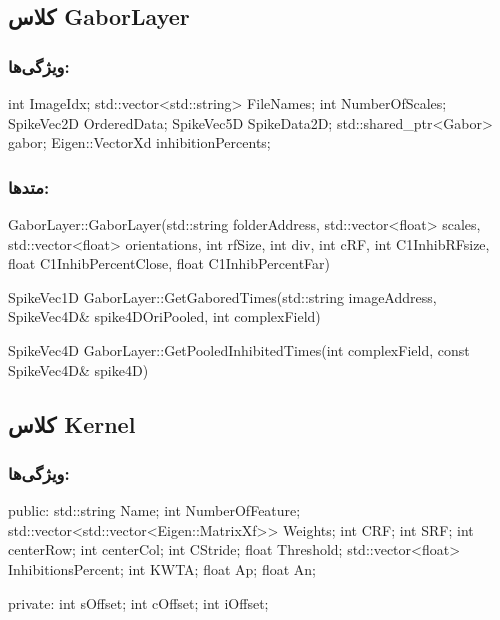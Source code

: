 \subsection{کلاس GaborLayer}
\subsubsection{ویژگی‌ها:}
\begin{C++source}
int ImageIdx;
std::vector<std::string> FileNames;
int NumberOfScales;
SpikeVec2D OrderedData;
SpikeVec5D SpikeData2D;
std::shared_ptr<Gabor> gabor;
Eigen::VectorXd inhibitionPercents;
\end{C++source}
\subsubsection{متدها:}
\begin{C++source}
GaborLayer::GaborLayer(std::string folderAddress, std::vector<float> scales, std::vector<float> orientations, int rfSize, int div, int cRF, int C1InhibRFsize, float C1InhibPercentClose, float C1InhibPercentFar)
\end{C++source}

\begin{C++source}
SpikeVec1D GaborLayer::GetGaboredTimes(std::string imageAddress, SpikeVec4D& spike4DOriPooled, int complexField)
\end{C++source}

\begin{C++source}
SpikeVec4D GaborLayer::GetPooledInhibitedTimes(int complexField, const SpikeVec4D& spike4D)
\end{C++source}

\subsection{کلاس Kernel}
\subsubsection{ویژگی‌ها:}
\begin{C++source}
public:
    std::string Name;
    int NumberOfFeature;
    std::vector<std::vector<Eigen::MatrixXf>> Weights;
    int CRF;
    int SRF;
    int centerRow;
    int centerCol;
    int CStride;
    float Threshold;
    std::vector<float> InhibitionsPercent;
    int KWTA;
    float Ap;
    float An;

private:
    int sOffset;
    int cOffset;
    int iOffset;
\end{C++source}
